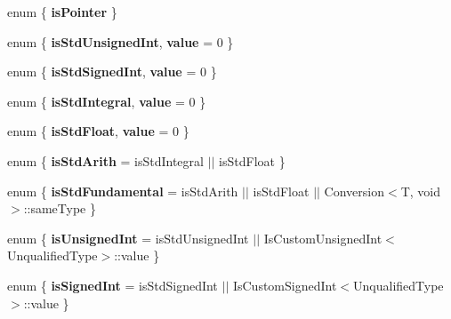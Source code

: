 \begin{DoxyCompactItemize}
\item 
\hypertarget{classLoki_1_1TypeTraits_a8fcb7ccb829176f25de6b56d1a7421a3}{}enum \{ {\bfseries is\+Pointer}
 \}\label{classLoki_1_1TypeTraits_a8fcb7ccb829176f25de6b56d1a7421a3}

\item 
\hypertarget{classLoki_1_1TypeTraits_a7f7f9921f22096915f6e6edda7368ecb}{}enum \{ {\bfseries is\+Std\+Unsigned\+Int}, 
{\bfseries value} = 0
 \}\label{classLoki_1_1TypeTraits_a7f7f9921f22096915f6e6edda7368ecb}

\item 
\hypertarget{classLoki_1_1TypeTraits_adde865d5cb77e0fa59d9e5bb4dc86333}{}enum \{ {\bfseries is\+Std\+Signed\+Int}, 
{\bfseries value} = 0
 \}\label{classLoki_1_1TypeTraits_adde865d5cb77e0fa59d9e5bb4dc86333}

\item 
\hypertarget{classLoki_1_1TypeTraits_aab01f465461e78464b7c34a5e4508a90}{}enum \{ {\bfseries is\+Std\+Integral}, 
{\bfseries value} = 0
 \}\label{classLoki_1_1TypeTraits_aab01f465461e78464b7c34a5e4508a90}

\item 
\hypertarget{classLoki_1_1TypeTraits_aad6167968c8814afe5cde260f805b826}{}enum \{ {\bfseries is\+Std\+Float}, 
{\bfseries value} = 0
 \}\label{classLoki_1_1TypeTraits_aad6167968c8814afe5cde260f805b826}

\item 
\hypertarget{classLoki_1_1TypeTraits_ac9ddcecafb80668b5bb37faee6e59fce}{}enum \{ {\bfseries is\+Std\+Arith} = is\+Std\+Integral $\vert$$\vert$ is\+Std\+Float
 \}\label{classLoki_1_1TypeTraits_ac9ddcecafb80668b5bb37faee6e59fce}

\item 
\hypertarget{classLoki_1_1TypeTraits_a28c8b68baf2c7ea811bf931987b87d41}{}enum \{ {\bfseries is\+Std\+Fundamental} = is\+Std\+Arith $\vert$$\vert$ is\+Std\+Float $\vert$$\vert$ Conversion$<$T, void$>$\+:\+:same\+Type
 \}\label{classLoki_1_1TypeTraits_a28c8b68baf2c7ea811bf931987b87d41}

\item 
\hypertarget{classLoki_1_1TypeTraits_aa8316623d4ebdba7517cc0c20debbcdb}{}enum \{ {\bfseries is\+Unsigned\+Int} = is\+Std\+Unsigned\+Int $\vert$$\vert$ Is\+Custom\+Unsigned\+Int$<$Unqualified\+Type$>$\+:\+:value
 \}\label{classLoki_1_1TypeTraits_aa8316623d4ebdba7517cc0c20debbcdb}

\item 
\hypertarget{classLoki_1_1TypeTraits_a71abd0e04dad19b4f776ad0a937833e5}{}enum \{ {\bfseries is\+Signed\+Int} = is\+Std\+Signed\+Int $\vert$$\vert$ Is\+Custom\+Signed\+Int$<$Unqualified\+Type$>$\+:\+:value
 \}\label{classLoki_1_1TypeTraits_a71abd0e04dad19b4f776ad0a937833e5}


\end{DoxyCompactItemize}
